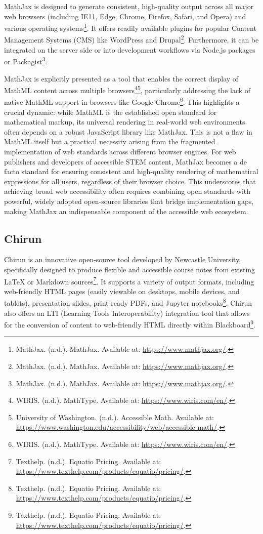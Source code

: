 MathJax is designed to generate consistent, high-quality output across all major web browsers (including IE11, Edge, Chrome, Firefox, Safari, and Opera) and various operating systems\footnote{MathJax. (n.d.). MathJax. Available at: \url{https://www.mathjax.org/}.}. It offers readily available plugins for popular Content Management Systems (CMS) like WordPress and Drupal\footnote{MathJax. (n.d.). MathJax. Available at: \url{https://www.mathjax.org/}.}. Furthermore, it can be integrated on the server side or into development workflows via Node.js packages or Packagist\footnote{MathJax. (n.d.). MathJax. Available at: \url{https://www.mathjax.org/}.}.

MathJax is explicitly presented as a tool that enables the correct display of MathML content across multiple browsers\footnote{WIRIS. (n.d.). MathType. Available at: \url{https://www.wiris.com/en/}.}\footnote{University of Washington. (n.d.). Accessible Math. Available at: \url{https://www.washington.edu/accessibility/web/accessible-math/}.}, particularly addressing the lack of native MathML support in browsers like Google Chrome\footnote{WIRIS. (n.d.). MathType. Available at: \url{https://www.wiris.com/en/}.}. This highlights a crucial dynamic: while MathML is the established open standard for mathematical markup, its universal rendering in real-world web environments often depends on a robust JavaScript library like MathJax. This is not a flaw in MathML itself but a practical necessity arising from the fragmented implementation of web standards across different browser engines. For web publishers and developers of accessible STEM content, MathJax becomes a de facto standard for ensuring consistent and high-quality rendering of mathematical expressions for all users, regardless of their browser choice. This underscores that achieving broad web accessibility often requires combining open standards with powerful, widely adopted open-source libraries that bridge implementation gaps, making MathJax an indispensable component of the accessible web ecosystem.

\subsection{Chirun}

Chirun is an innovative open-source tool developed by Newcastle University, specifically designed to produce flexible and accessible course notes from existing LaTeX or Markdown sources\footnote{Texthelp. (n.d.). Equatio Pricing. Available at: \url{https://www.texthelp.com/products/equatio/pricing/}.}. It supports a variety of output formats, including web-friendly HTML pages (easily viewable on desktops, mobile devices, and tablets), presentation slides, print-ready PDFs, and Jupyter notebooks\footnote{Texthelp. (n.d.). Equatio Pricing. Available at: \url{https://www.texthelp.com/products/equatio/pricing/}.}. Chirun also offers an LTI (Learning Tools Interoperability) integration tool that allows for the conversion of content to web-friendly HTML directly within Blackboard\footnote{Texthelp. (n.d.). Equatio Pricing. Available at: \url{https://www.texthelp.com/products/equatio/pricing/}.}.

